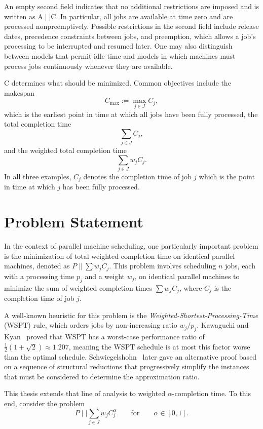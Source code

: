 \documentclass[%
english, titlepage=false %
]{./tum-templates/book/tumbook}
\begin{document}
An empty second field indicates that no additional restrictions are
imposed and is written as $\mathrm{A}\mid\mid\mathrm{C}$. In particular, all jobs are available at time zero and are
processed nonpreemptively. Possible restrictions in the second field
include release dates, precedence constraints between jobs, and preemption, 
which allows a job's processing to be interrupted and resumed later.
One may also distinguish between models that permit idle time and models in which machines 
must process jobs continuously whenever they are available.

\(\mathrm{C}\) determines what should be minimized. Common
objectives include the makespan
\[
    C_{\max}:=\max_{j\in J}C_j,
\]
which is the earliest point in time at which all jobs have been fully processed,
the total completion time
\[
    \sum_{j\in J}C_j,
\]
and the weighted total completion time
\[
    \sum_{j\in J}w_jC_j.
\]
In all three examples, $C_j$ denotes the completion time of job $j$ which is the 
point in time at which $j$ has been fully processed. 



\section{Problem Statement}

In the context of parallel machine scheduling, one particularly important problem is the minimization 
of total weighted completion time on identical parallel machines, denoted as $P \!\parallel\!\sum w_j C_j$. 
This problem involves scheduling $n$ jobs, each with a processing time $p_j$ and a weight $w_j$, on
identical parallel machines to minimize the sum of weighted completion times $\sum w_jC_j$, where $C_j$ 
is the completion time of job $j$.

A well-known heuristic for this problem is the \emph{Weighted-Shortest-Processing-Time} ($\mathrm{WSPT}$) rule, 
which orders jobs by 
non-increasing ratio $w_j / p_j$. Kawaguchi and Kyan~\cite{KawaguchiKyan:1988} proved that 
$\mathrm{WSPT}$ has a worst-case performance ratio of $\frac{1}{2}(1 + \sqrt{2}) \approx 1.207$, meaning the $\mathrm{WSPT}$ schedule 
is at most this factor worse than the optimal schedule. Schwiegelshohn~\cite{Schwiegelshohn:2011} later gave 
an alternative proof based on a sequence of structural reductions that progressively simplify the instances 
that must be considered to determine the approximation ratio.

This thesis extends that line of analysis to weighted $\alpha$-completion time.
To this end, consider the problem
\[
    P\mid\mid\sum_{j\in J}w_jC_j^\alpha \qquad \text{for} \qquad \alpha \in [0,1].
\]
\end{document}
